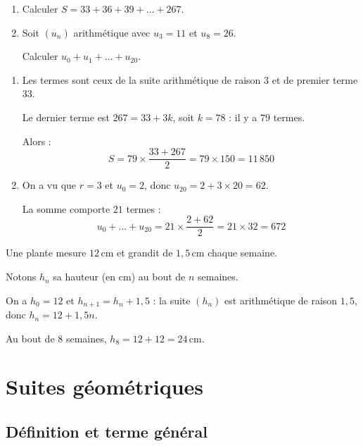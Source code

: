 \documentclass{poly}
\begin{document}
\begin{methode}
	\begin{enumerate}
		\item Calculer $S = 33 + 36 + 39 + \dots + 267$.
		\item Soit $(u_n)$ arithmétique avec $u_3 = 11$ et $u_8 = 26$.

		      Calculer $u_0 + u_1 + \dots + u_{20}$.
	\end{enumerate}

	\begin{correction}
		\nline
		\begin{enumerate}
			\item Les termes sont ceux de la suite arithmétique de raison $3$ et de premier terme $33$.

			      Le dernier terme est $267 = 33 + 3k$, soit $k = 78$ : il y a $79$ termes.

			      Alors :
			      \[
				      S = 79 \times \dfrac{33 + 267}{2} = 79 \times 150 = 11\,850
			      \]
			\item On a vu que $r = 3$ et $u_0 = 2$, donc $u_{20} = 2 + 3 \times 20 = 62$.

			      La somme comporte $21$ termes :
			      \[
				      u_0 + \dots + u_{20} = 21 \times \dfrac{2 + 62}{2} = 21 \times 32 = 672
			      \]
		\end{enumerate}
	\end{correction}
\end{methode}

\begin{ex}
	Une plante mesure $12\,\text{cm}$ et grandit de $1{,}5\,\text{cm}$ chaque semaine.

	Notons $h_n$ sa hauteur (en cm) au bout de $n$ semaines.

	On a $h_0 = 12$ et $h_{n+1} = h_n + 1{,}5$ : la suite $(h_n)$ est arithmétique de raison $1{,}5$, donc $h_n = 12 + 1{,}5n$.

	Au bout de $8$ semaines, $h_8 = 12 + 12 = 24\,\text{cm}$.
\end{ex}

\section{Suites géométriques}

\subsection{Définition et terme général}
\end{document}
